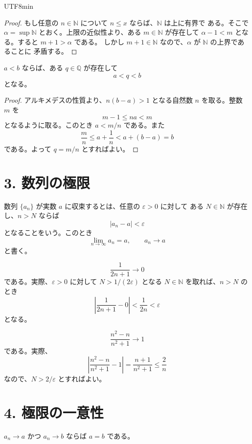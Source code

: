 \documentclass[a4paper,12pt]{article}
\begin{document}
\begin{CJK}{UTF8}{min}
\begin{proof}
もし任意の $n\in\mathbb{N}$ について $n\le x$ ならば、$\mathbb{N}$ は上に有界で
ある。そこで $\alpha=\sup\mathbb{N}$ とおく。上限の近似性より、ある
$m\in\mathbb{N}$ が存在して $\alpha-1<m$ となる。すると $m+1>\alpha$ である。
しかし $m+1\in\mathbb{N}$ なので、$\alpha$ が $\mathbb{N}$ の上界であることに
矛盾する。
\end{proof}

\begin{theorem}[有理数の稠密性]
$a<b$ ならば、ある $q\in\mathbb{Q}$ が存在して
\[
a<q<b
\]
となる。
\end{theorem}

\begin{proof}
アルキメデスの性質より、$n(b-a)>1$ となる自然数 $n$ を取る。整数 $m$ を
\[
m-1\le na<m
\]
となるように取る。このとき $a<m/n$ である。また
\[
\frac{m}{n}\le a+\frac{1}{n}<a+(b-a)=b
\]
である。よって $q=m/n$ とすればよい。
\end{proof}

\section*{3. 数列の極限}

\begin{definition}
数列 $\{a_n\}$ が実数 $a$ に収束するとは、任意の $\varepsilon>0$ に対して
ある $N\in\mathbb{N}$ が存在し、$n>N$ ならば
\[
|a_n-a|<\varepsilon
\]
となることをいう。このとき
\[
\lim_{n\to\infty}a_n=a,\qquad a_n\to a
\]
と書く。
\end{definition}

\begin{example}
\[
\frac{1}{2n+1}\to 0
\]
である。実際、$\varepsilon>0$ に対して $N>1/(2\varepsilon)$ となる
$N\in\mathbb{N}$ を取れば、$n>N$ のとき
\[
\left|\frac{1}{2n+1}-0\right|<\frac{1}{2n}<\varepsilon
\]
となる。
\end{example}

\begin{example}
\[
\frac{n^2-n}{n^2+1}\to 1
\]
である。実際、
\[
\left|\frac{n^2-n}{n^2+1}-1\right|
=\frac{n+1}{n^2+1}\le \frac{2}{n}
\]
なので、$N>2/\varepsilon$ とすればよい。
\end{example}

\section*{4. 極限の一意性}

\begin{theorem}
$a_n\to a$ かつ $a_n\to b$ ならば $a=b$ である。
\end{theorem}


\end{CJK}
\end{document}
